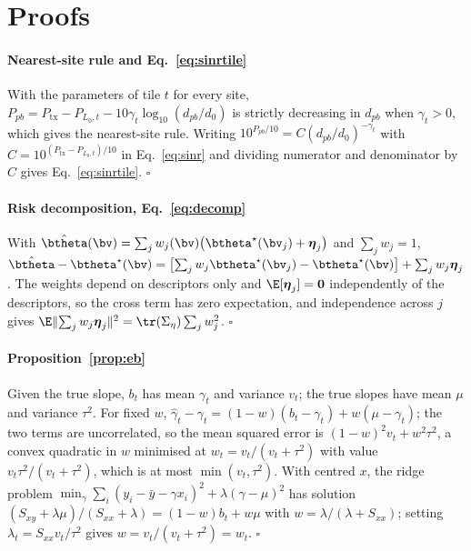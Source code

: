\section{Proofs}
\label{app:proofs}

\paragraph{Nearest-site rule and Eq.~\eqref{eq:sinrtile}}
With the parameters of tile $t$ for every site,
$P_{pb}=P_{\mathrm{tx}}-P_{L_0,t}-10\gamma_t\log_{10}(d_{pb}/d_0)$ is strictly
decreasing in $d_{pb}$ when $\gamma_t>0$, which gives the nearest-site rule.
Writing $10^{P_{pb}/10}=C(d_{pb}/d_0)^{-\gamma_t}$ with
$C=10^{(P_{\mathrm{tx}}-P_{L_0,t})/10}$ in Eq.~\eqref{eq:sinr} and dividing
numerator and denominator by $C$ gives Eq.~\eqref{eq:sinrtile}.
\hfill$\square$

\paragraph{Risk decomposition, Eq.~\eqref{eq:decomp}}
With $\hat\btheta(\bv)=\sum_j w_j(\bv)\bigl(\btheta^{\star}(\bv_j)+\boldsymbol\eta_j\bigr)$
and $\sum_j w_j=1$,
$\hat\btheta-\btheta^{\star}(\bv)=\bigl[\sum_j w_j\btheta^{\star}(\bv_j)-\btheta^{\star}(\bv)\bigr]
+\sum_j w_j\boldsymbol\eta_j$. The weights depend on descriptors only and
$\E[\boldsymbol\eta_j]=\mathbf0$ independently of the descriptors, so the
cross term has zero expectation, and independence across $j$ gives
$\E\lVert\sum_j w_j\boldsymbol\eta_j\rVert^{2}=\tr(\Sigma_\eta)\sum_j w_j^{2}$.
\hfill$\square$

\paragraph{Proposition~\ref{prop:eb}}
Given the true slope, $b_t$ has mean $\gamma_t$ and variance $v_t$; the true
slopes have mean $\mu$ and variance $\tau^{2}$. For fixed $w$,
$\hat\gamma_t-\gamma_t=(1-w)(b_t-\gamma_t)+w(\mu-\gamma_t)$; the two terms
are uncorrelated, so the mean squared error is
$(1-w)^{2}v_t+w^{2}\tau^{2}$, a convex quadratic in $w$ minimised at
$w_t=v_t/(v_t+\tau^{2})$ with value $v_t\tau^{2}/(v_t+\tau^{2})$, which is
at most $\min(v_t,\tau^{2})$. With centred $x$, the ridge problem
$\min_\gamma\sum_i(y_i-\bar y-\gamma x_i)^{2}+\lambda(\gamma-\mu)^{2}$ has
solution $(S_{xy}+\lambda\mu)/(S_{xx}+\lambda)=(1-w)b_t+w\mu$ with
$w=\lambda/(\lambda+S_{xx})$; setting $\lambda_t=S_{xx}v_t/\tau^{2}$ gives
$w=v_t/(v_t+\tau^{2})=w_t$.
\hfill$\square$

